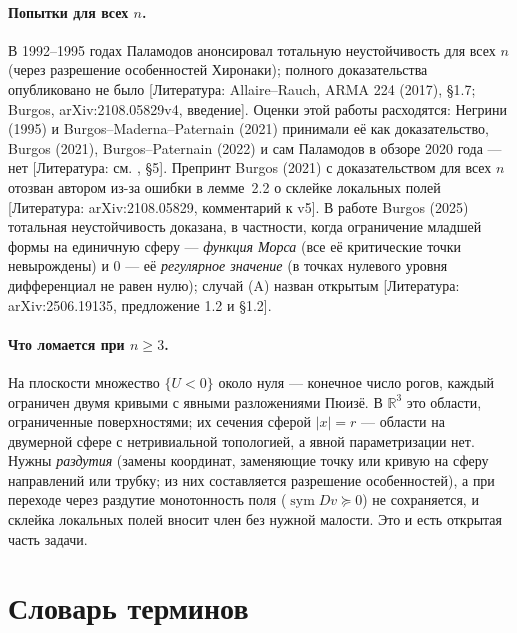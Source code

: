 \documentclass[11pt,a4paper]{article}
\theoremstyle{definition}
\newcommand{\R}{\mathbb R}
\newcommand{\sym}{\operatorname{sym}}
\newcommand{\mk}[1]{\textsf{[#1]}}
\newcommand{\term}[1]{\emph{#1}}
\begin{document}
\paragraph{Попытки для всех $n$.} В 1992--1995 годах Паламодов анонсировал тотальную
неустойчивость для всех $n$ (через разрешение особенностей Хиронаки); полного доказательства
опубликовано не было \mk{Литература: Allaire--Rauch, ARMA 224 (2017), §1.7; Burgos,
arXiv:2108.05829v4, введение}. Оценки этой работы расходятся: Негрини (1995) и Burgos--Maderna--Paternain
(2021) принимали её как доказательство, Burgos (2021), Burgos--Paternain (2022) и сам Паламодов в
обзоре 2020 года --- нет \mk{Литература: см. , §5}. Препринт
Burgos (2021) с доказательством для всех $n$ отозван автором из-за ошибки в лемме~2.2 о склейке
локальных полей \mk{Литература: arXiv:2108.05829, комментарий к v5}. В работе Burgos (2025)
тотальная неустойчивость доказана, в частности, когда ограничение младшей формы на единичную
сферу --- \term{функция Морса} (все её критические точки невырождены) и $0$ --- её
\term{регулярное значение} (в точках нулевого уровня дифференциал не равен нулю); случай (A)
назван открытым \mk{Литература: arXiv:2506.19135, предложение 1.2 и §1.2}.

\paragraph{Что ломается при $n\ge3$.} На плоскости множество $\{U<0\}$ около нуля --- конечное
число рогов, каждый ограничен двумя кривыми с явными разложениями Пюизё. В $\R^3$ это области,
ограниченные поверхностями; их сечения сферой $|x|=r$ --- области на двумерной сфере с
нетривиальной топологией, а явной параметризации нет. Нужны \term{раздутия} (замены координат,
заменяющие точку или кривую на сферу направлений или трубку; из них составляется разрешение
особенностей), а при переходе через раздутие монотонность поля ($\sym Dv\succeq0$) не
сохраняется, и склейка локальных полей вносит член без нужной малости. Это и есть открытая
часть задачи.

\appendix
\section{Словарь терминов}\label{app:glossary}
\end{document}
